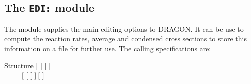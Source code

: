 \subsection{The {\tt EDI:} module}\label{sect:EDIData}

The  module supplies the main editing options to DRAGON. It can be
use to compute the reaction rates, average and condensed cross sections to store
this information on a file for further use. The calling specifications are:

\begin{DataStructure}{Structure }
 \moc{:=}  $[$  $]$
 $[$   $]$ \\
~~~~~$[$  $[$  $]~]~[$  $]$ \moc{::} 
\end{DataStructure}

